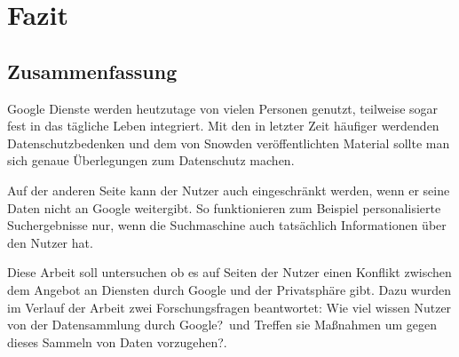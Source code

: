 %
% 

\chapter{Fazit}


\section{Zusammenfassung}

Google Dienste werden heutzutage von vielen Personen genutzt, teilweise sogar fest in das tägliche Leben integriert. 
Mit den in letzter Zeit häufiger werdenden Datenschutzbedenken und dem von Snowden veröffentlichten Material sollte man sich genaue Überlegungen zum Datenschutz machen. 

Auf der anderen Seite kann der Nutzer auch eingeschränkt werden, wenn er seine Daten nicht an Google weitergibt. So funktionieren zum Beispiel personalisierte Suchergebnisse nur, wenn die Suchmaschine auch tatsächlich Informationen über den Nutzer hat.

Diese Arbeit soll untersuchen ob es auf Seiten der Nutzer einen Konflikt zwischen dem Angebot an Diensten durch Google und der Privatsphäre gibt. Dazu wurden im Verlauf der Arbeit zwei Forschungsfragen beantwortet: \glqq Wie viel wissen Nutzer von der Datensammlung durch Google?\grqq\ und \glqq Treffen sie Maßnahmen um gegen dieses Sammeln von Daten vorzugehen?\grqq .

